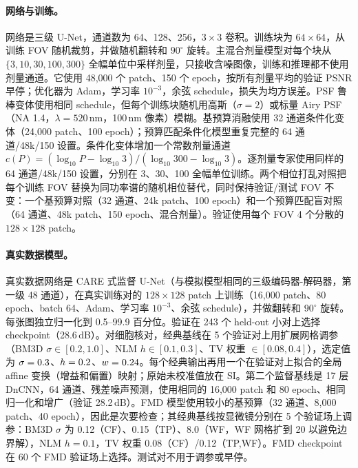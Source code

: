 \documentclass[11pt]{ctexart}
\begin{document}
\paragraph{网络与训练。}
网络是三级 U-Net\cite{ronneberger2015unet}，通道数为 64、128、256，$3\times3$ 卷积。训练块为 $64\times64$，从训练 FOV 随机裁剪，并做随机翻转和 $90^\circ$ 旋转。主混合剂量模型对每个块从 $\{3,10,30,100,300\}$ 全幅单位中采样剂量，只接收含噪图像，训练和推理都不使用剂量通道。它使用 48{,}000 个 patch、150 个 epoch，按所有剂量平均的验证 PSNR 早停；优化器为 Adam，学习率 $10^{-3}$，余弦 schedule，损失为均方误差。PSF 鲁棒变体使用相同 schedule，但每个训练块随机用高斯（$\sigma=2$）或标量 Airy PSF（NA 1.4，$\lambda=520$\,nm，100\,nm 像素）模糊。基预算消融使用 32 通道条件化变体（24{,}000 patch、100 epoch）；预算匹配条件化模型重复完整的 64 通道/48k/150 设置。条件化变体增加一个常数剂量通道 $c(P)=(\log_{10}P-\log_{10}3)/(\log_{10}300-\log_{10}3)$。逐剂量专家使用同样的 64 通道/48k/150 设置，分别在 3、30、100 全幅单位训练。两个相位打乱对照把每个训练 FOV 替换为同功率谱的随机相位替代，同时保持验证/测试 FOV 不变：一个基预算对照（32 通道、24k patch、100 epoch）和一个预算匹配盲对照（64 通道、48k patch、150 epoch、混合剂量）。验证使用每个 FOV 4 个分散的 $128\times128$ patch。

\paragraph{真实数据模型。}
真实数据网络是 CARE 式监督 U-Net（与模拟模型相同的三级编码器-解码器，第一级 48 通道），在真实训练对的 $128\times128$ patch 上训练（16{,}000 patch、80 epoch、batch 64、Adam、学习率 $10^{-3}$、余弦 schedule），并做翻转和 $90^\circ$ 旋转。每张图独立归一化到 0.5--99.9 百分位。验证在 243 个 held-out 小对上选择 checkpoint（28.6\,dB）。对细胞核对，经典基线在 5 个验证对上用扩展网格调参（BM3D\cite{dabov2007} $\sigma\in[0.2,1.0]$、NLM $h\in[0.1,0.3]$、TV 权重 $\in[0.08,0.4]$），选定值为 $\sigma=0.3$、$h=0.2$、$w=0.24$。每个经典输出再用一个在验证对上拟合的全局 affine 变换（增益和偏置）映射；原始未校准值放在 SI。第二个监督基线是 17 层 DnCNN\cite{zhang2017dncnn}，64 通道、残差噪声预测，使用相同的 16{,}000 patch 和 80 epoch、相同归一化和增广（验证 28.2\,dB）。FMD 模型使用较小的基预算（32 通道、8{,}000 patch、40 epoch），因此是次要检查；其经典基线按显微镜分别在 5 个验证场上调参：BM3D $\sigma$ 为 0.12（CF）、0.15（TP）、8.0（WF，WF 网格扩到 20 以避免边界解），NLM $h=0.1$，TV 权重 0.08（CF）/0.12（TP,WF）。FMD checkpoint 在 60 个 FMD 验证场上选择。测试对不用于调参或早停。
\end{document}
